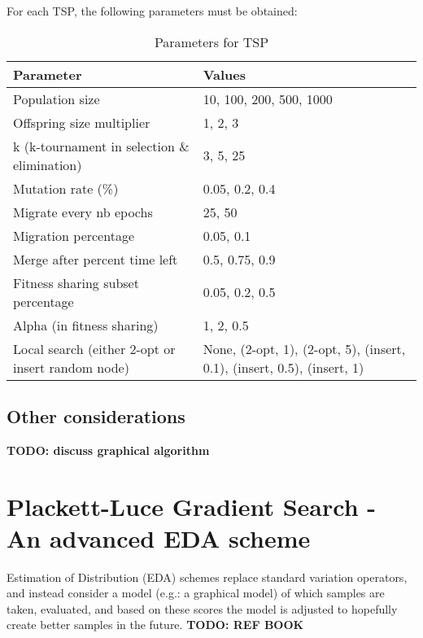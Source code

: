 \documentclass[a4paper,10pt]{article}
\newcommand{\ReplaceMe}[1]{{\color{blue}#1}}
\begin{document}
	For each TSP, the following parameters must be obtained:
	\begin{table}[ht]
		\centering
		\begin{tabularx}{0.9\textwidth}{|X|X|}
			\hline
			\textbf{Parameter} & \textbf{Values} \\
			\hline
			Population size & 10, 100, 200, 500, 1000 \\
			\hline
			Offspring size multiplier & 1, 2, 3 \\
			\hline
			k (k-tournament in selection \& elimination) & 3, 5, 25 \\
			\hline
			Mutation rate (\%) & 0.05, 0.2, 0.4 \\
			\hline
			Migrate every nb epochs & 25, 50 \\
			\hline
			Migration percentage & 0.05, 0.1 \\
			\hline
			Merge after percent time left & 0.5, 0.75, 0.9 \\
			\hline
			Fitness sharing subset percentage & 0.05, 0.2, 0.5 \\
			\hline
			Alpha (in fitness sharing) & 1, 2, 0.5 \\
			\hline
			Local search (either 2-opt or insert random node) & None, (2-opt, 1), (2-opt, 5), (insert, 0.1), (insert, 0.5), (insert, 1) \\
			\hline
		\end{tabularx}
		\caption{Parameters for TSP}
	\end{table}

	

\subsection{Other considerations}\label{sec_oth}
\textbf{TODO: discuss graphical algorithm}





\section{Plackett-Luce Gradient Search - An advanced EDA scheme} \label{cha:pl-gs}
	Estimation of Distribution (EDA) schemes replace standard variation operators, and instead consider a model (e.g.: a graphical model) of which samples are taken, evaluated, and based on these scores the model is adjusted to hopefully create better samples in the future. \textbf{TODO: REF BOOK}
	
\end{document}
